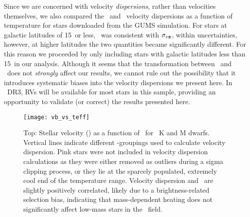 Since we are concerned with velocity {\it dispersions}, rather than velocities
themselves, we also compared the \vb\ and \vz\ velocity dispersions as a
function of temperature for
stars downloaded from the GUMS simulation.
For stars at galactic latitudes of 15\degrees\ or less, \sigmavb\ was
consistent with $\sigma_{v{\bf z}}$, within uncertainties, however, at higher
latitudes the two quantities became significantly different.
For this reason we proceeded by only including stars with galactic latitudes
less than 15\degrees\ in our analysis.
Although it seems that the transformation between \vz\ and \vb\ does not {\it
strongly} affect our results, we cannot rule out the possibility that it
introduces systematic biases into the velocity dispersions we present here.
In \gaia\ DR3, RVs will be available for most stars in this sample, providing
an opportunity to validate (or correct) the results presented here.


\begin{figure}
  \caption{
      Top: Stellar velocity (\vb) as a function of \teff\ for
      \kepler\ K and M dwarfs.
Vertical lines indicate different \teff-groupings used to calculate velocity
    dispersion.
Pink stars were not included in velocity dispersion calculations as they were
    either removed as outliers during a sigma clipping process, or they lie at
    the sparcely populated, extremely cool end of the temperature range.
    Velocity dispersion and \teff\ are slightly positively correlated, likely
    due to a brightness-related selection bias, indicating that mass-dependent
    heating does not significantly affect low-mass stars in the \kepler\
    field.
}
  \centering
    \texttt{[image: vb\_vs\_teff]}
\label{fig:vb_vs_teff}
\end{figure}

